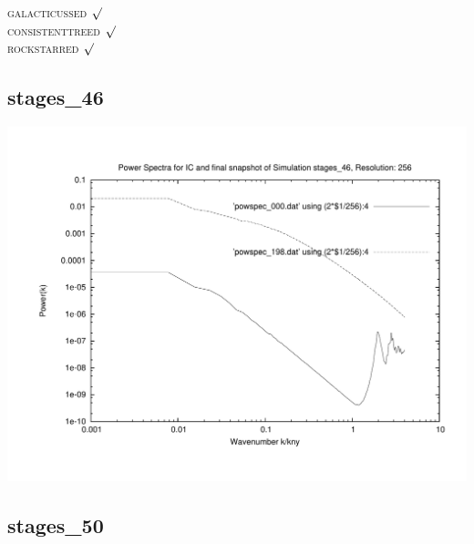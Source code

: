 \textsc{galacticussed} $\surd$ \\
\textsc{consistenttreed} $\surd$ \\ 
\textsc{rockstarred} $\surd$


% 
%
%
%
%
%
%
%


\newpage
\subsection{stages\_46}

\includegraphics[scale=0.5]{r256/stages_46/plot_powspec_stages_46}


% 
%
%
%
%
%
%
%


\newpage
\subsection{stages\_50}

